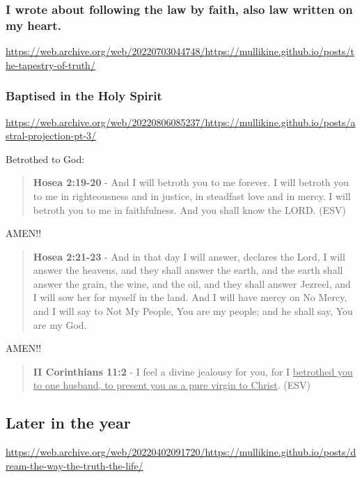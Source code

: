 \documentclass[11pt]{article}
\begin{document}
\subsubsection{I wrote about following the law by faith, also law written on my heart.}
\label{sec:org875394b}

\url{https://web.archive.org/web/20220703044748/https://mullikine.github.io/posts/the-tapestry-of-truth/}

\subsubsection{Baptised in the Holy Spirit}
\label{sec:org7759839}
\url{https://web.archive.org/web/20220806085237/https://mullikine.github.io/posts/astral-projection-pt-3/}

Betrothed to God:

\begin{quote}
\textbf{Hosea 2:19-20} - And I will betroth you to me forever. I will betroth you to me in righteousness and in justice, in steadfast love and in mercy. I will betroth you to me in faithfulness. And you shall know the LORD. (ESV)
\end{quote}

AMEN!!

\begin{quote}
\textbf{Hosea 2:21-23} - And in that day I will answer, declares the Lord, I will answer the heavens, and they shall answer the earth, and the earth shall answer the grain, the wine, and the oil, and they shall answer Jezreel, and I will sow her for myself in the land. And I will have mercy on No Mercy, and I will say to Not My People, You are my people; and he shall say, You are my God.
\end{quote}

AMEN!!

\begin{quote}
\textbf{II Corinthians 11:2} - I feel a divine jealousy for you, for I \uline{betrothed you to one husband, to present you as a pure virgin to Christ}. (ESV)
\end{quote}

\subsection{Later in the year}
\label{sec:orgb5534d6}
\url{https://web.archive.org/web/20220402091720/https://mullikine.github.io/posts/dream-the-way-the-truth-the-life/}
\end{document}
